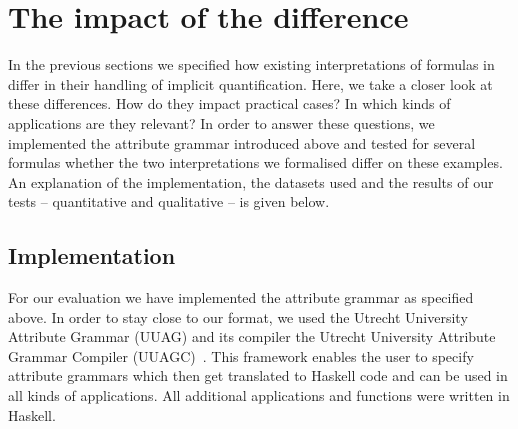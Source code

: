 
\section{The impact of the difference}\label{eva}
In the previous sections we 
specified how existing interpretations of formulas in \nthreelogic differ in their handling of implicit quantification. Here, 
we take a closer look at these differences. 
How do they impact 
practical cases? In which kinds of applications are they relevant?
In order to answer these questions, we implemented the attribute grammar introduced above and tested for several formulas
whether the two interpretations we formalised 
differ on these examples. %
An explanation of the implementation, the datasets used and the results of our tests -- quantitative and qualitative -- is given below. 

\subsection{Implementation}\label{imp}
For our evaluation we have implemented the attribute grammar as specified above. 
In order to stay close to our format, we used the Utrecht University Attribute Grammar (UUAG) and its compiler 
the Utrecht University Attribute Grammar Compiler (UUAGC)~\cite{uuag}. This framework enables the user to specify attribute grammars which 
then get translated to Haskell code and can be used in all kinds of applications. All additional applications and functions were written in Haskell.
%
% 


